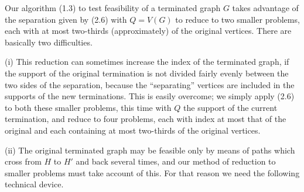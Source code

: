Our algorithm (1.3) to test feasibility of a terminated graph $G$ takes advantage of the separation given by (2.6) with $Q = V(G)$ to reduce to two smaller problems, each with at most two-thirds (approximately) of the original vertices. There are basically two difficulties.

\hspace*{12pt}(i) This reduction can sometimes increase the index of the terminated graph, if the support of the original termination is not divided fairly evenly between the two sides of the separation, because the ``separating'' vertices are included in the supports of the new terminations. This is easily overcome; we simply apply (2.6) to both these smaller problems, this time with $Q$ the support of the current termination, and reduce to four problems, each with index at most that of the original and each containing at most two-thirds of the original vertices.

\hspace*{12pt}(ii) The original terminated graph may be feasible only by means of paths which cross from $H$ to $H'$ and back several times, and our method of reduction to smaller problems must take account of this. For that reason we need the following technical device.
